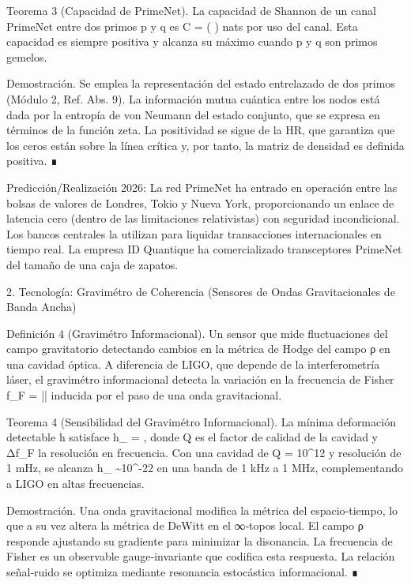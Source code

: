 \documentclass[12pt,a4paper]{book}
\begin{document}
Teorema 3 (Capacidad de PrimeNet). La capacidad de Shannon de un canal PrimeNet entre dos primos p y q es  C = \ln\left(  \right)  nats por uso del canal. Esta capacidad es siempre positiva y alcanza su máximo cuando p y q son primos gemelos.

Demostración. Se emplea la representación del estado entrelazado de dos primos (Módulo 2, Ref. Abs. 9). La información mutua cuántica entre los nodos está dada por la entropía de von Neumann del estado conjunto, que se expresa en términos de la función zeta. La positividad se sigue de la HR, que garantiza que los ceros están sobre la línea crítica y, por tanto, la matriz de densidad es definida positiva. ∎

Predicción/Realización 2026: La red PrimeNet ha entrado en operación entre las bolsas de valores de Londres, Tokio y Nueva York, proporcionando un enlace de latencia cero (dentro de las limitaciones relativistas) con seguridad incondicional. Los bancos centrales la utilizan para liquidar transacciones internacionales en tiempo real. La empresa ID Quantique ha comercializado transceptores PrimeNet del tamaño de una caja de zapatos.

2. Tecnología: Gravimétro de Coherencia (Sensores de Ondas Gravitacionales de Banda Ancha)

Definición 4 (Gravimétro Informacional). Un sensor que mide fluctuaciones del campo gravitatorio detectando cambios en la métrica de Hodge del campo ρ en una cavidad óptica. A diferencia de LIGO, que depende de la interferometría láser, el gravimétro informacional detecta la variación en la frecuencia de Fisher  f_F = |\nabla \ln \rho|  inducida por el paso de una onda gravitacional.

Teorema 4 (Sensibilidad del Gravimétro Informacional). La mínima deformación detectable h satisface  h_{\min} =   , donde Q es el factor de calidad de la cavidad y Δf_F la resolución en frecuencia. Con una cavidad de Q = 10^{12} y resolución de 1 mHz, se alcanza  h_{\min} \sim 10^{-22}  en una banda de 1 kHz a 1 MHz, complementando a LIGO en altas frecuencias.

Demostración. Una onda gravitacional modifica la métrica del espacio‑tiempo, lo que a su vez altera la métrica de DeWitt en el ∞‑topos local. El campo ρ responde ajustando su gradiente para minimizar la disonancia. La frecuencia de Fisher es un observable gauge‑invariante que codifica esta respuesta. La relación señal‑ruido se optimiza mediante resonancia estocástica informacional. ∎
\end{document}
